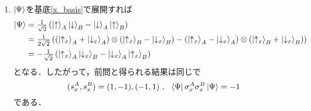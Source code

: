 \documentclass[a4paper,pdflatex,ja=standard]{bxjsarticle}
\begin{document}
\begin{enumerate}
  \item 
  $\ket{\Psi}$を基底\eqref{x_basis}で展開すれば
  \begin{align}
    \ket{\Psi}
    &=
    \tfrac{1}{\sqrt{2}}
    \left( \ket{\uparrow}_{A}\ket{\downarrow}_{B}
    -
    \ket{\downarrow}_{A}\ket{\uparrow}_{B} \right)
    \nonumber
    \\
    &=
    \tfrac{1}{2\sqrt{2}}
    \left( (\ket{\uparrow_{x}}_{A}+\ket{\downarrow_{x}}_{A})\otimes(\ket{\uparrow_{x}}_{B}-\ket{\downarrow_{x}}_{B})
    -
    (\ket{\uparrow_{x}}_{A}-\ket{\downarrow_{x}}_{A})\otimes(\ket{\uparrow_{x}}_{B}+\ket{\downarrow_{x}}_{B}) \right)
    \nonumber
    \\
    &=
    -\tfrac{1}{\sqrt{2}}
    \left( \ket{\uparrow_{x}}_{A}\ket{\downarrow_{x}}_{B}
    -
    \ket{\downarrow_{x}}_{A}\ket{\uparrow_{x}}_{B} \right)
  \end{align}
  となる．したがって，前問と得られる結果は同じで
  \begin{equation}
    (s_{x}^{A},s_{x}^{B})
    =
    (1,-1),(-1,1)
    \ ,\ \ 
    \bra{\Psi}\sigma_{x}^{A}\sigma_{x}^{B}\ket{\Psi}
    =
    -1
  \end{equation}
  である．


\end{enumerate}
\end{document}
